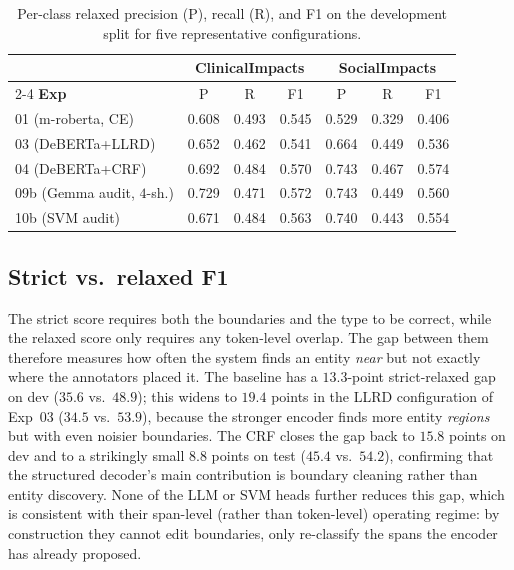 \documentclass[journal]{IEEEtran}
\begin{document}
\begin{table}[!t]
\renewcommand{\arraystretch}{1.1}
\caption{Per-class relaxed precision (P), recall (R), and F1 on the
development split for five representative configurations.}
\label{tab:per_class}
\centering
\footnotesize
\setlength{\tabcolsep}{4pt}
\begin{tabular}{l c c c c c c}
\hline
& \multicolumn{3}{c}{\textbf{ClinicalImpacts}} & \multicolumn{3}{c}{\textbf{SocialImpacts}} \\
\cline{2-4}\cline{5-7}
\textbf{Exp} & P & R & F1 & P & R & F1 \\
\hline
01 (m-roberta, CE)            & 0.608 & 0.493 & 0.545 & 0.529 & 0.329 & 0.406 \\
03 (DeBERTa+LLRD)             & 0.652 & 0.462 & 0.541 & 0.664 & 0.449 & 0.536 \\
04 (DeBERTa+CRF)              & 0.692 & 0.484 & 0.570 & 0.743 & 0.467 & 0.574 \\
09b (Gemma audit, $4$-sh.)    & 0.729 & 0.471 & 0.572 & 0.743 & 0.449 & 0.560 \\
10b (SVM audit)               & 0.671 & 0.484 & 0.563 & 0.740 & 0.443 & 0.554 \\
\hline
\end{tabular}
\end{table}

\subsection{Strict vs.\ relaxed F1}
\label{sssec:strict_vs_relaxed}
The strict score requires both the boundaries and the type to be
correct, while the relaxed score only requires any token-level
overlap. The gap between them therefore measures how often the
system finds an entity \emph{near} but not exactly where the
annotators placed it. The baseline has a $13.3$-point strict-relaxed
gap on dev ($35.6$ vs.\ $48.9$); this widens to $19.4$ points in the
LLRD configuration of Exp~03 ($34.5$ vs.\ $53.9$), because the
stronger encoder finds more entity \emph{regions} but with even
noisier boundaries. The CRF closes the gap back to $15.8$ points on
dev and to a strikingly small $8.8$ points on test ($45.4$ vs.\
$54.2$), confirming that the structured decoder's main contribution
is boundary cleaning rather than entity discovery. None of the LLM
or SVM heads further reduces this gap, which is consistent with
their span-level (rather than token-level) operating regime: by
construction they cannot edit boundaries, only re-classify the
spans the encoder has already proposed.
\end{document}

